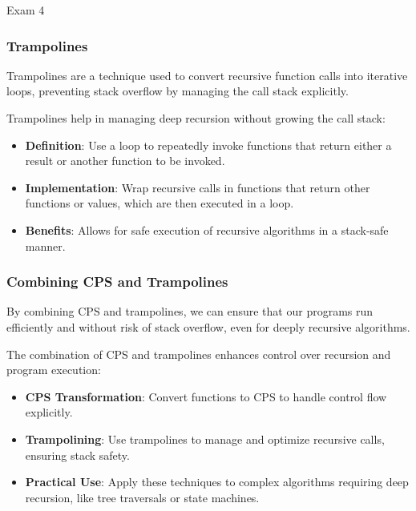\begin{examnotes}{Exam 4}
    \subsubsection*{Trampolines}
    
    Trampolines are a technique used to convert recursive function calls into iterative loops, preventing stack overflow by managing the call stack explicitly.
    
    \begin{highlight}
        Trampolines help in managing deep recursion without growing the call stack:
        \begin{itemize}
            \item \textbf{Definition}: Use a loop to repeatedly invoke functions that return either a result or another function to be invoked.
            \item \textbf{Implementation}: Wrap recursive calls in functions that return other functions or values, which are then executed in a loop.
            \item \textbf{Benefits}: Allows for safe execution of recursive algorithms in a stack-safe manner.
        \end{itemize}
    \end{highlight}
    
    \subsubsection*{Combining CPS and Trampolines}
    
    By combining CPS and trampolines, we can ensure that our programs run efficiently and without risk of stack overflow, even for deeply recursive algorithms.
    
    \begin{highlight}
        The combination of CPS and trampolines enhances control over recursion and program execution:
        \begin{itemize}
            \item \textbf{CPS Transformation}: Convert functions to CPS to handle control flow explicitly.
            \item \textbf{Trampolining}: Use trampolines to manage and optimize recursive calls, ensuring stack safety.
            \item \textbf{Practical Use}: Apply these techniques to complex algorithms requiring deep recursion, like tree traversals or state machines.
        \end{itemize}
    \end{highlight}
    

\end{examnotes}

